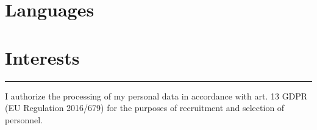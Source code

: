 \documentclass[11pt,a4paper,sans]{moderncv} %
\begin{document}


\section{Languages}



\section{Interests}

\renewcommand{\listitemsymbol}{-~} %



\vfill

\noindent\rule{5cm}{1pt}

I authorize the processing of my personal data in accordance with art. 13
GDPR (EU Regulation 2016/679) for the purposes of recruitment and selection
of personnel.

\vspace{1cm}
\end{document}

